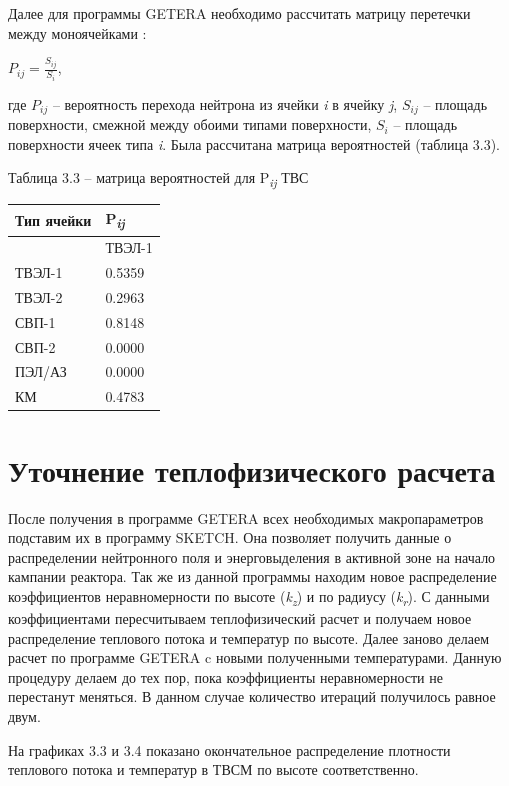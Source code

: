 Далее для программы GETERA необходимо рассчитать матрицу перетечки между
моноячейками :

\(P_{ij} = \frac{S_{ij}}{S_{i}}\),

где \(P_{ij}\) -- вероятность перехода нейтрона из ячейки
\emph{i} в ячейку \emph{j}, \(S_{ij}\) -- площадь поверхности,
смежной между обоими типами поверхности, \(S_{i}\) -- площадь
поверхности ячеек типа \emph{i}. Была рассчитана матрица вероятностей
(таблица 3.3).

Таблица 3.3 -- матрица вероятностей для P\emph{\textsubscript{ij}} ТВС

\begin{longtable}[]{@{}ll@{}}
\toprule
Тип ячейки & P\emph{\textsubscript{ij}}\tabularnewline
\midrule
\endhead
& ТВЭЛ-1\tabularnewline
ТВЭЛ-1 & 0.5359\tabularnewline
ТВЭЛ-2 & 0.2963\tabularnewline
СВП-1 & 0.8148\tabularnewline
СВП-2 & 0.0000\tabularnewline
ПЭЛ/АЗ & 0.0000\tabularnewline
КМ & 0.4783\tabularnewline
\bottomrule
\end{longtable}

\section{Уточнение теплофизического расчета}

После получения в программе GETERA всех необходимых макропараметров
подставим их в программу SKETCH. Она позволяет получить данные о
распределении нейтронного поля и энерговыделения в активной зоне на
начало кампании реактора. Так же из данной программы находим новое
распределение коэффициентов неравномерности по высоте
(\emph{k\textsubscript{z}}) и по радиусу (\emph{k\textsubscript{r­}}). С
данными коэффициентами пересчитываем теплофизический расчет и получаем
новое распределение теплового потока и температур по высоте. Далее
заново делаем расчет по программе GETERA c новыми полученными
температурами. Данную процедуру делаем до тех пор, пока коэффициенты
неравномерности не перестанут меняться. В данном случае количество
итераций получилось равное двум.

На графиках 3.3 и 3.4 показано окончательное распределение плотности
теплового потока и температур в ТВСМ по высоте соответственно.

